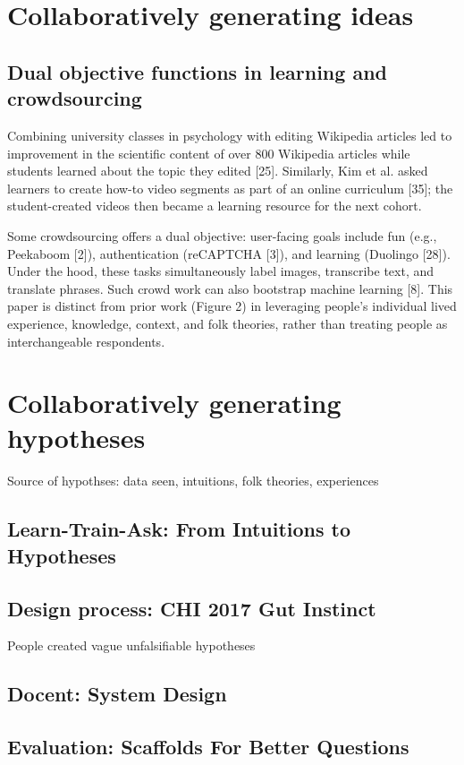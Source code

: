 


\chapter{Collaboratively generating ideas}

\section{Dual objective functions in learning and crowdsourcing}
Combining university classes in psychology with editing
Wikipedia articles led to improvement in the scientific
content of over 800 Wikipedia articles while students
learned about the topic they edited [25]. Similarly, Kim et
al. asked learners to create how-to video segments as part
of an online curriculum [35]; the student-created videos
then became a learning resource for the next cohort. 

Some crowdsourcing offers a dual objective: user-facing
goals include fun (e.g., Peekaboom [2]), authentication
(reCAPTCHA [3]), and learning (Duolingo [28]). Under the
hood, these tasks simultaneously label images, transcribe
text, and translate phrases. Such crowd work can also bootstrap machine learning [8]. This paper is distinct from prior
work (Figure 2) in leveraging people’s individual lived
experience, knowledge, context, and folk theories, rather
than treating people as interchangeable respondents.


\chapter{Collaboratively generating hypotheses}
Source of hypothses: data seen, intuitions, folk theories, experiences

\section{Learn-Train-Ask: From Intuitions to Hypotheses}
\section{Design process: CHI 2017 Gut Instinct}
People created vague unfalsifiable hypotheses

\section{Docent: System Design}
\section{Evaluation: Scaffolds For Better Questions}

